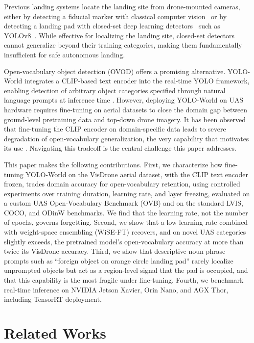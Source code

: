\documentclass[conf]{new-aiaa}
\begin{document}
Previous landing systems locate the landing site from drone-mounted cameras, either by detecting a fiducial marker with classical computer vision~\cite{fattahi2017automatic} or by detecting a landing pad with closed-set deep learning detectors~\cite{xu2024small} such as YOLOv8~\cite{ultralytics2023}. While effective for localizing the landing site, closed-set detectors cannot generalize beyond their training categories, making them fundamentally insufficient for safe autonomous landing.

Open-vocabulary object detection (OVOD) offers a promising alternative. YOLO-World integrates a CLIP-based text encoder into the real-time YOLO framework, enabling detection of arbitrary object categories specified through natural language prompts at inference time \cite{cheng2024yoloworld, radford2021learning}. However, deploying YOLO-World on UAS hardware requires fine-tuning on aerial datasets to close the domain gap between ground-level pretraining data and top-down drone imagery. It has been observed that fine-tuning the CLIP encoder on domain-specific data leads to severe degradation of open-vocabulary generalization, the very capability that motivates its use \cite{cheng2024yoloworld}. Navigating this tradeoff is the central challenge this paper addresses.

This paper makes the following contributions. First, we characterize how fine-tuning
YOLO-World on the VisDrone aerial dataset, with the CLIP text encoder frozen, trades domain
accuracy for open-vocabulary retention, using controlled experiments over training duration,
learning rate, and layer freezing, evaluated on a custom UAS Open-Vocabulary Benchmark (OVB)
and on the standard LVIS, COCO, and ODinW benchmarks. We find that the learning rate, not the
number of epochs, governs forgetting. Second, we show that a low learning rate combined with
weight-space ensembling (WiSE-FT) recovers, and on novel UAS categories slightly exceeds, the
pretrained model's open-vocabulary accuracy at more than twice its VisDrone accuracy. Third, we
show that descriptive noun-phrase prompts such as ``foreign object on orange circle landing
pad'' rarely localize unprompted objects but act as a region-level signal that the pad is
occupied, and that this capability is the most fragile under fine-tuning. Fourth, we benchmark real-time inference on NVIDIA
Jetson Xavier, Orin Nano, and AGX Thor, including TensorRT deployment.


\section{Related Works}
\end{document}

